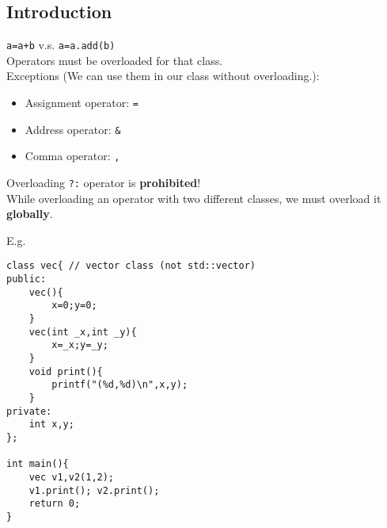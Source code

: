 \documentclass[12pt,a4paper]{article}
\begin{document}
		\subsection{Introduction}
			\texttt{a=a+b} v.s. \texttt{a=a.add(b)}\\
			Operators must be overloaded for that class.\\
			Exceptions (We can use them in our class without overloading.):
			\begin{itemize}
				\item Assignment operator: \texttt{=}
				\item Address operator: \texttt{\&}
				\item Comma operator: \texttt{,}
			\end{itemize}
			Overloading \texttt{?:} operator is \textbf{prohibited}!\\
			While overloading an operator with two different classes, we must overload it \textbf{globally}.
		
		
	\clearpage
			E.g.
			\begin{lstlisting}
class vec{ // vector class (not std::vector)
public:
	vec(){
		x=0;y=0;
	}
	vec(int _x,int _y){
		x=_x;y=_y;
	}
	void print(){
		printf("(%d,%d)\n",x,y);
	}
private:
	int x,y;
};

int main(){
	vec v1,v2(1,2);
	v1.print(); v2.print();
	return 0;
}
\end{lstlisting}
	
\end{document}
